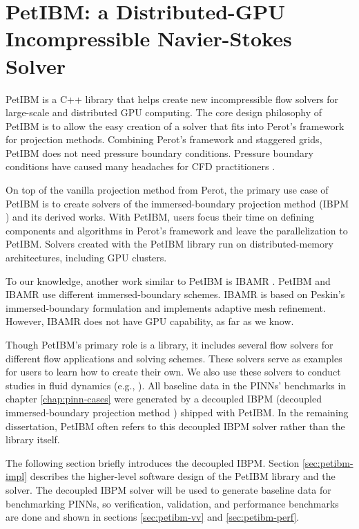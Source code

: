\chapter{PetIBM: a Distributed-GPU Incompressible Navier-Stokes Solver}\label{chap:petibm}

PetIBM is a C++ library that helps create new incompressible flow solvers for large-scale and distributed GPU computing.
The core design philosophy of PetIBM is to allow the easy creation of a solver that fits into Perot's framework \cite{perot_analysis_1993} for projection methods.
Combining Perot's framework and staggered grids, PetIBM does not need pressure boundary conditions.
Pressure boundary conditions have caused many headaches for CFD practitioners \cite{gresho_pressure_1987,sani_resume_1994}.

On top of the vanilla projection method from Perot, the primary use case of PetIBM is to create solvers of the immersed-boundary projection method (IBPM \cite{taira_immersed_2007}) and its derived works.
With PetIBM, users focus their time on defining components and algorithms in Perot's framework and leave the parallelization to PetIBM.
Solvers created with the PetIBM library run on distributed-memory architectures, including GPU clusters.

To our knowledge, another work similar to PetIBM is IBAMR \cite{griffith_adaptive_2007,bhalla_unified_2013}. 
PetIBM and IBAMR use different immersed-boundary schemes.
IBAMR is based on Peskin's immersed-boundary formulation \cite{Peskin2002} and implements adaptive mesh refinement.
However, IBAMR does not have GPU capability, as far as we know.

Though PetIBM's primary role is a library, it includes several flow solvers for different flow applications and solving schemes.
These solvers serve as examples for users to learn how to create their own.
We also use these solvers to conduct studies in fluid dynamics (e.g., \cite{mesnard_reproducible_2017}).
All baseline data in the PINNs' benchmarks in chapter \ref{chap:pinn-cases} were generated by a decoupled IBPM (decoupled immersed-boundary projection method \cite{li_efficient_2016}) shipped with PetIBM.
In the remaining dissertation, PetIBM often refers to this decoupled IBPM solver rather than the library itself.

The following section briefly introduces the decoupled IBPM.
Section \ref{sec:petibm-impl} describes the higher-level software design of the PetIBM library and the solver.
The decoupled IBPM solver will be used to generate baseline data for benchmarking PINNs, so verification, validation, and performance benchmarks are done and shown in sections \ref{sec:petibm-vv} and \ref{sec:petibm-perf}.

